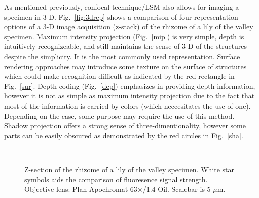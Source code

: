 As mentioned previously, confocal technique/LSM also allows for imaging a specimen in 3-D. 
Fig.~\ref{fig:3drep} shows a comparison of four representation options of a 3-D image acquisition (z-stack) of the rhizome of a lily of the valley specimen. 
Maximum intensity projection (Fig.~\ref{mip}) is very simple, depth is intuitively recognizeable, and still maintains the sense of 3-D of the structures despite the simplicity. 
It is the most commonly used representation. 
Surface rendering approaches may introduce some texture on the surface of structures which could make recognition difficult as indicated by the red rectangle in Fig.~\ref{sur}. 
Depth coding (Fig.~\ref{dep}) emphasizes in providing depth information, however it is not as simple as maximum intensity projection due to the fact that most of the information is carried by colors (which neccesitates the use of one). 
Depending on the case, some purpose may require the use of this method. Shadow projection offers a strong sense of three-dimentionality, however some parts can be easily obscured as demonstrated by the red circles in Fig.~\ref{sha}. 

\begin{figure}[h!]
\centering
{}\hspace{0.1em}
\hspace{0.1em}
\\
\caption{Z-section of the rhizome of a lily of the valley specimen. 
White star symbols aids the comparison of fluoresence signal strength. 
Objective lens: Plan Apochromat 63$\times$/1.4 Oil. 
Scalebar is 5 $\mu$m.} 
\label{fig:zstep}
\end{figure}

